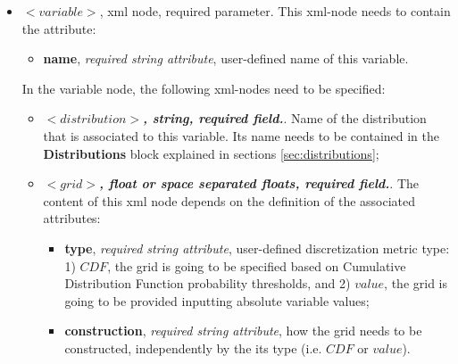 \begin{itemize}
\item $<variable>$, xml node, required parameter. This xml-node needs to contain the attribute:
\begin{itemize}
  \item \textbf{name}, \textit{required string attribute}, user-defined name of this variable. 
 \end{itemize}
 In the variable node, the following xml-nodes need to be specified:
 \begin{itemize}
    \item $<distribution>$\textbf{\textit{, string, required field.}}. Name of the distribution that is associated to this variable. Its name needs to be contained in the \textbf{Distributions} block explained in sections \ref{sec:distributions};
    \item $<grid>$\textbf{\textit{, float or space separated floats, required field.}}. The content of this xml node depends on the definition of the associated attributes:
\begin{itemize}
\itemsep0em
\item \textbf{type}, \textit{required string attribute}, user-defined discretization metric type: 1) $CDF$, the grid is going to be specified based on  Cumulative Distribution Function probability thresholds, and 2) $value$, the grid is going to be provided inputting absolute variable values;
\item \textbf{construction}, \textit{required string attribute}, how the grid needs to be constructed, independently by the its type (i.e. $CDF$ or $value$). 
\end{itemize}


\end{itemize}
\end{itemize}
